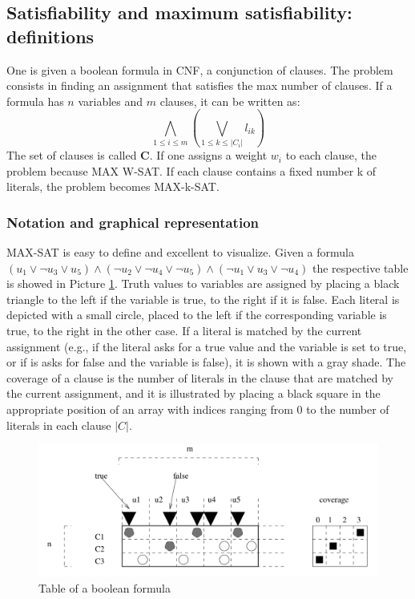 \documentclass[10pt]{article}
\begin{document}
\subsection{Satisfiability and maximum satisfiability: definitions}
One is given a boolean formula in CNF, a conjunction of clauses. The problem consists in finding an assignment that satisfies the max number of clauses. If a formula has $n$ variables and $m$ clauses, it can be written as:
$$
\bigwedge\limits_{1 \leq i \leq m} ( \bigvee\limits_{1 \leq k \leq |C_{i}|} l_{ik})
$$
The set of clauses is called $\boldsymbol{C}$. If one assigns a weight $w_i$ to each clause, the problem because MAX W-SAT. If each clause contains a fixed number k of literals, the problem becomes MAX-k-SAT.

\subsubsection{Notation and graphical representation}
MAX-SAT is easy to define and excellent to visualize. Given a formula $ (u_1 \lor \lnot u_3 \lor u_5) \land (\lnot u_2 \lor \lnot u_4 \lor \lnot u_5 ) \land ( \lnot u_1 \lor u_3 \lor \lnot u_4 )$ the respective table is showed in Picture \ref{fig:bool}.
Truth values to variables are assigned by placing a black triangle to the left if the variable is true, to the right if it is false. Each literal is depicted with a small circle, placed to the left if the corresponding variable is true, to the right in the other case. If a literal is matched by the current assignment (e.g., if the literal asks for a true value and the variable is set to true, or if is asks for false and the variable is false), it is shown with a gray shade. The coverage of a clause is the number of literals in the clause that are matched by the current assignment, and it is illustrated by placing a black square in the appropriate position of an array with indices ranging from 0 to the number of literals in each clause $|C|$.

\begin{figure}[H]
\includegraphics[scale=0.5]{bool}
\caption{Table of a boolean formula}
\centering
\label{fig:bool}
\end{figure}
\end{document}
